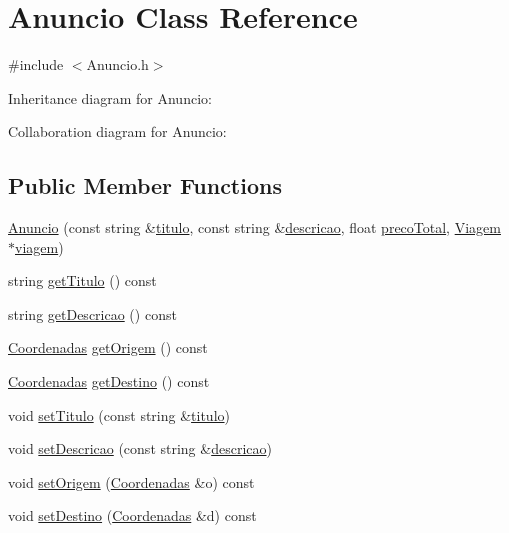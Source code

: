 \hypertarget{class_anuncio}{\section{Anuncio Class Reference}
\label{class_anuncio}
}


{\ttfamily \#include $<$Anuncio.\+h$>$}



Inheritance diagram for Anuncio\+:


Collaboration diagram for Anuncio\+:
\subsection*{Public Member Functions}
\begin{DoxyCompactItemize}
\item 
\hyperlink{class_anuncio_a9234fed1e72396ea1c304919c0ed2a3a}{Anuncio} (const string \&\hyperlink{class_anuncio_adb34bedd8220f42b9ee37662c21313e6}{titulo}, const string \&\hyperlink{class_anuncio_aa6a9eb8d08cb06d16061b006eb2c8b97}{descricao}, float \hyperlink{class_anuncio_a8ba7cc797b8b582c596038a17e9bce3b}{preco\+Total}, \hyperlink{class_viagem}{Viagem} $\ast$\hyperlink{class_anuncio_aa225374a19420f56f5abc258d96b691a}{viagem})
\item 
string \hyperlink{class_anuncio_af712423e3645f7127f987d88793127d4}{get\+Titulo} () const 
\item 
string \hyperlink{class_anuncio_a693f59391a620851b4ac37063e8f4af4}{get\+Descricao} () const 
\item 
\hyperlink{class_coordenadas}{Coordenadas} \hyperlink{class_anuncio_a4a0c6be721a7fe4351cd5fa06b8bafcd}{get\+Origem} () const 
\item 
\hyperlink{class_coordenadas}{Coordenadas} \hyperlink{class_anuncio_a207905709390f67bb9546e4d94682bb5}{get\+Destino} () const 
\item 
void \hyperlink{class_anuncio_af95db56a1347160ef1cf53ea1ec659a6}{set\+Titulo} (const string \&\hyperlink{class_anuncio_adb34bedd8220f42b9ee37662c21313e6}{titulo})
\item 
void \hyperlink{class_anuncio_a8746d4708c5622947b17385414320e88}{set\+Descricao} (const string \&\hyperlink{class_anuncio_aa6a9eb8d08cb06d16061b006eb2c8b97}{descricao})
\item 
void \hyperlink{class_anuncio_ac88555aa5c54bc552eb6a31787334e39}{set\+Origem} (\hyperlink{class_coordenadas}{Coordenadas} \&o) const 
\item 
void \hyperlink{class_anuncio_add212eaa271e366dccaa82a8f2bee736}{set\+Destino} (\hyperlink{class_coordenadas}{Coordenadas} \&d) const 

\end{DoxyCompactItemize}
